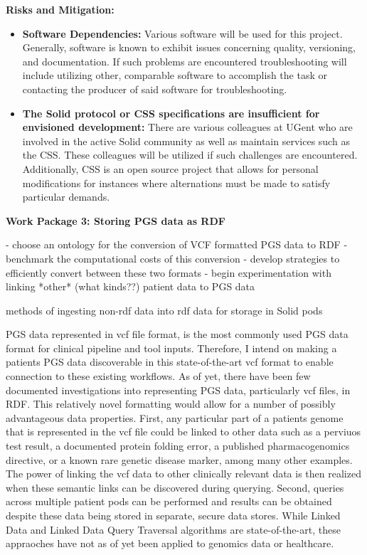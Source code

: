 \documentclass[a4paper,11pt]{article}
\begin{document}
\textbf{Risks and Mitigation:} 
\begin{itemize}
	\item \textbf{Software Dependencies:} Various software will be used for this project. Generally, software is known to exhibit issues concerning quality, versioning, and documentation. If such problems are encountered troubleshooting will include utilizing other, comparable software to accomplish the task or contacting the producer of said software for troubleshooting.
	\item \textbf{The Solid protocol or CSS specifications are insufficient for envisioned development:} There are various colleagues at UGent who are involved in the active Solid community as well as maintain services such as the CSS. These colleagues will be utilized if such challenges are encountered. Additionally, CSS is an open source project that allows for personal modifications for instances where alternations must be made to satisfy particular demands. 
\end{itemize}


\textbf{Work Package 3:  Storing PGS data as RDF}

- choose an ontology for the conversion of VCF formatted PGS data to RDF
- benchmark the computational costs of this conversion
- develop strategies to efficiently convert between these two formats
- begin experimentation with linking *other* (what kinds??) patient data to PGS data

methods of ingesting non-rdf data into rdf data for storage in Solid pods

PGS data represented in vcf file format, is the most commonly used PGS data format for clinical pipeline and tool inputs. 
Therefore, I intend on making a patient\textquotesingle s PGS data discoverable in this state-of-the-art vcf format to enable connection to these existing workflows. 
As of yet, there have been few documented investigations into representing PGS data, particularly vcf files, in RDF. 
This relatively novel formatting would allow for a number of possibly advantageous data properties. 
First, any particular part of a patient\textquotesingle s genome that is represented in the vcf file could be linked to other data such as a perviuos test result, a documented protein folding error, a published pharmacogenomics directive, or a known rare genetic disease marker, among many other examples.
The power of linking the vcf data to other clinically relevant data is then realized when these semantic links can be discovered during querying. 
Second, queries across multiple patient pods can be performed and results can be obtained despite these data being stored in separate, secure data stores.
While Linked Data and Linked Data Query Traversal algorithms are state-of-the-art, these appraoches have not as of yet been applied to genomics data or healthcare.
\end{document}
